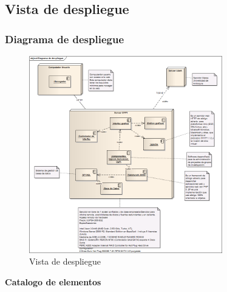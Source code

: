 \documentclass[12pt,oneside,letterpaper]{report}
\begin{document}
\subsection{Vista de despliegue}

\subsubsection{Diagrama de despliegue}

\begin{figure}[h!]
  \centering
    \includegraphics[width=0.75\textwidth]{./img/img22.png}
  \caption{Vista de despliegue}
\end{figure}

\textbf{Catalogo de elementos}
\end{document}
